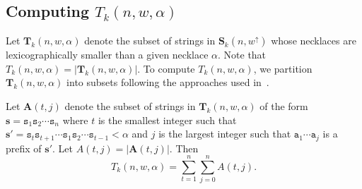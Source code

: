\documentclass[US-letter,USenglish,authorcolumns,autoref]{lipics-v2021}
\renewcommand{\tt} {\mathtt}
\newcommand{\bS}{\mathbf{S}}
\newcommand{\bs}{\mathbf{s}}
\begin{document}
\subsection{Computing $T_k(n,w,\alpha)$}



Let $\textbf{T}_k(n,w,\alpha)$ denote the subset of strings in $\bS_k(n,w^\uparrow)$ whose necklaces are lexicographically smaller than a given necklace $\alpha$.  Note that $T_k(n,w,\alpha) = |\textbf{T}_k(n,w,\alpha)|$.  To compute $T_k(n,w,\alpha)$, we partition $\textbf{T}_k(n,w,\alpha)$ into subsets following the approaches used in~\cite{ranking,hartman}.  

%
Let $\textbf{A}(t,j)$ denote the subset of strings  in $\textbf{T}_k(n,w,\alpha)$ of the form $\bs= \tt{s}_1\tt{s}_2\cdots \tt{s}_{n}$ where $t$ is the smallest integer such that $\bs'= \tt{s}_t\tt{s}_{t+1}\cdots \tt{s}_1\tt{s}_2\cdots \tt{s}_{t-1} < \alpha$ and $j$ is the largest integer such that $\tt{a}_1 \cdots \tt{a}_j$ is a prefix of $\bs'$.   Let $A(t,j) =  |\textbf{A}(t,j)|$. %
 Then
\[
T_k(n,w, \alpha) =  \displaystyle{\sum_{t=1}^{n}\sum_{j=0}^{n} A(t,j).}
\]

\end{document}
